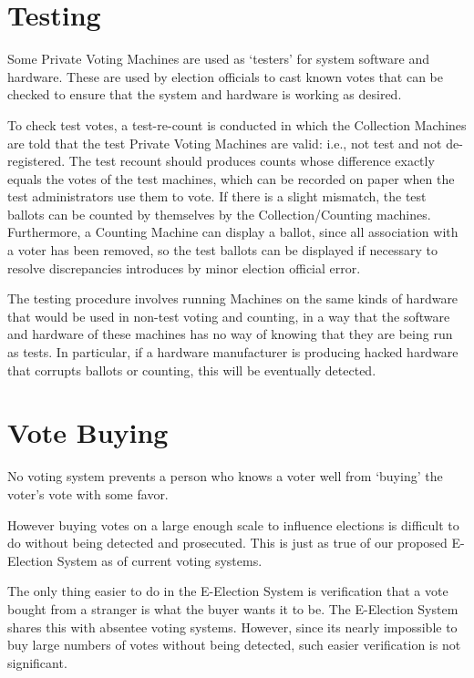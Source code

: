 \documentclass[12pt]{article}
\begin{document}
\section{Testing}

Some Private Voting Machines are used as `testers'\label{TESTER} for
system software and hardware.
These are used by election officials to cast known votes that can
be checked to ensure that the system and hardware is working as
desired.

To check test votes, a test-re-count is conducted in which
the Collection Machines are told that the test Private Voting
Machines are valid: i.e., not test and not de-registered.  The
test recount should produces counts whose difference exactly
equals the votes of the test machines, which can be recorded on
paper when the test administrators use them to vote.  If there
is a slight mismatch, the test ballots can be counted by themselves
by the Collection/Counting machines.  Furthermore, a Counting Machine
can display a ballot, since all association with a voter has been
removed, so the test ballots can be displayed if necessary to
resolve discrepancies introduces by minor election official error.

The testing procedure involves running Machines on the same kinds
of hardware that would be used in non-test voting and counting,
in a way that the software and hardware of these machines has no
way of knowing that they are being run as tests.  In particular, if a
hardware manufacturer is producing hacked hardware that corrupts
ballots or counting, this will be eventually detected.

\section{Vote Buying}

No voting system prevents a person who knows a voter well from
`buying' the voter's vote with some favor.

However buying votes on a large enough scale to influence elections
is difficult to do without being detected and prosecuted.
This is just as true of our proposed E-Election System as of
current voting systems.

The only thing easier to do in the E-Election System is verification
that a vote bought from a stranger
is what the buyer wants it to be.  The E-Election
System shares this with absentee voting systems.  However, since its
nearly impossible to buy large numbers of votes without being detected,
such easier verification is not significant.
\end{document}
